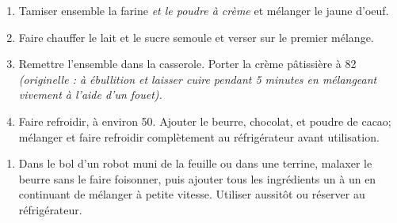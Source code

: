 
\begin{ingredients}
\end{ingredients}


\begin{recipe}
  \begin{enumerate}

  \item Tamiser ensemble la farine \textit{et le poudre à crème} et mélanger le
    jaune d’oeuf.

  \item Faire chauffer le lait et le sucre semoule et verser sur le
    premier mélange.

  \item Remettre l’ensemble dans la casserole.  Porter la crème
    pâtissière à 82\degreeC{} \textit{(originelle : à ébullition et laisser cuire pendant 5 minutes en
      mélangeant vivement à l’aide d’un fouet).}

  \item Faire refroidir, à environ 50\degreeC. Ajouter le beurre, chocolat,
    et poudre de cacao; mélanger et faire refroidir complètement au
    réfrigérateur avant utilisation.

  \end{enumerate}
\end{recipe}


\begin{ingredients}
\end{ingredients}


\begin{recipe}
  \begin{enumerate}

  \item Dans le bol d’un robot muni de la feuille ou dans une terrine,
    malaxer le beurre sans le faire foisonner, puis ajouter tous les
    ingrédients un à un en continuant de mélanger à petite vitesse.
    Utiliser aussitôt ou réserver au réfrigérateur.

  \end{enumerate}
\end{recipe}


